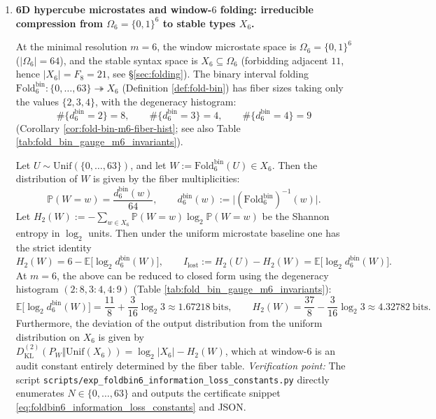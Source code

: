 \begin{enumerate}
  \item \textbf{6D hypercube microstates and window-\(6\) folding: irreducible compression from \(\Omega_6=\{0,1\}^6\) to stable types \(X_6\).}

  \begin{theorem}
  \label{thm:terminal-foldbin6-64-to-21-hist}
  At the minimal resolution \(m=6\), the window microstate space is \(\Omega_6=\{0,1\}^6\) (\(|\Omega_6|=64\)), and the stable syntax space is \(X_6\subseteq\Omega_6\) (forbidding adjacent \(11\), hence \(|X_6|=F_8=21\), see \S\ref{sec:folding}).
  The binary interval folding \(\mathrm{Fold}^{\mathrm{bin}}_6:\{0,\dots,63\}\twoheadrightarrow X_6\) (Definition \ref{def:fold-bin}) has fiber sizes taking only the values
  \(\{2,3,4\}\), with the degeneracy histogram:
  \[
  \#\{d^{\mathrm{bin}}_6=2\}=8,\qquad
  \#\{d^{\mathrm{bin}}_6=3\}=4,\qquad
  \#\{d^{\mathrm{bin}}_6=4\}=9
  \]
  (Corollary \ref{cor:fold-bin-m6-fiber-hist}; see also Table \ref{tab:fold_bin_gauge_m6_invariants}).
  \end{theorem}

  

  \begin{theorem}\label{thm:terminal-foldbin6-information-loss-constants}
  Let \(U\sim\mathrm{Unif}(\{0,\dots,63\})\), and let \(W:=\mathrm{Fold}^{\mathrm{bin}}_6(U)\in X_6\).
  Then the distribution of \(W\) is given by the fiber multiplicities:
  \[
  \mathbb{P}(W=w)=\frac{d^{\mathrm{bin}}_6(w)}{64},\qquad d^{\mathrm{bin}}_6(w):=\bigl|(\mathrm{Fold}^{\mathrm{bin}}_6)^{-1}(w)\bigr|.
  \]
  Let \(H_2(W):=-\sum_{w\in X_6}\mathbb{P}(W=w)\log_2\mathbb{P}(W=w)\) be the Shannon entropy in \(\log_2\) units. Then under the uniform microstate baseline one has the strict identity
  \[
  H_2(W)=6-\mathbb{E}\bigl[\log_2 d^{\mathrm{bin}}_6(W)\bigr],
  \qquad
  I_{\mathrm{lost}}:=H_2(U)-H_2(W)=\mathbb{E}\bigl[\log_2 d^{\mathrm{bin}}_6(W)\bigr].
  \]
  At \(m=6\), the above can be reduced to closed form using the degeneracy histogram \((2{:}8,3{:}4,4{:}9)\) (Table \ref{tab:fold_bin_gauge_m6_invariants}):
  \[
  \mathbb{E}\bigl[\log_2 d^{\mathrm{bin}}_6(W)\bigr]
  =\frac{11}{8}+\frac{3}{16}\log_2 3
  \approx 1.67218\ \text{bits},
  \qquad
  H_2(W)=\frac{37}{8}-\frac{3}{16}\log_2 3\approx 4.32782\ \text{bits}.
  \]
  Furthermore, the deviation of the output distribution from the uniform distribution on \(X_6\) is given by
  \(
  D^{(2)}_{\mathrm{KL}}(P_W\Vert \mathrm{Unif}(X_6))=\log_2|X_6|-H_2(W)
  \),
  which at window-\(6\) is an audit constant entirely determined by the fiber table.
  \emph{Verification point:} The script \texttt{scripts/exp\_foldbin6\_information\_loss\_constants.py} directly enumerates \(N\in\{0,\dots,63\}\) and outputs the certificate snippet \eqref{eq:foldbin6_information_loss_constants} and JSON.
  \end{theorem}
  


\end{enumerate}
